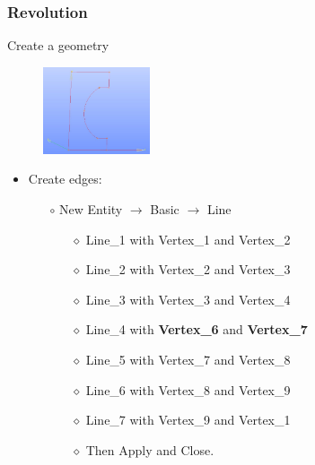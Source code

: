 \documentclass[10pt, hyperref={unicode=true,pdfusetitle, bookmarks=true,bookmarksnumbered=false,bookmarksopen=false, breaklinks=false,pdfborder={0 0 1},backref=true,colorlinks=true,linkcolor=darkblue,pageanchor}]{beamer}
\begin{document}
\begin{frame}
\frametitle{Revolution}
\begin{block}{Create a geometry}

\begin{figure}
\includegraphics[width=0.28\textwidth]{PICTURES/salome7.jpg}
\end{figure}

\begin{itemize}

\item Create edges:
    \begin{itemize}
    \item [$\circ$] New Entity $\rightarrow$ Basic $\rightarrow$ Line
        \begin{itemize}
        \item [$\diamond$] Line\_1 with Vertex\_1 and Vertex\_2
        \item [$\diamond$] Line\_2 with Vertex\_2 and Vertex\_3
        \item [$\diamond$] Line\_3 with Vertex\_3 and Vertex\_4
        \item [$\diamond$] Line\_4 with \textbf{Vertex\_6} and \textbf{Vertex\_7}
        \item [$\diamond$] Line\_5 with Vertex\_7 and Vertex\_8
        \item [$\diamond$] Line\_6 with Vertex\_8 and Vertex\_9
        \item [$\diamond$] Line\_7 with Vertex\_9 and Vertex\_1
        \item [$\diamond$] Then Apply and Close.
        \end{itemize}
    \end{itemize}
\end{itemize}

\end{block}
\end{frame}
\end{document}
